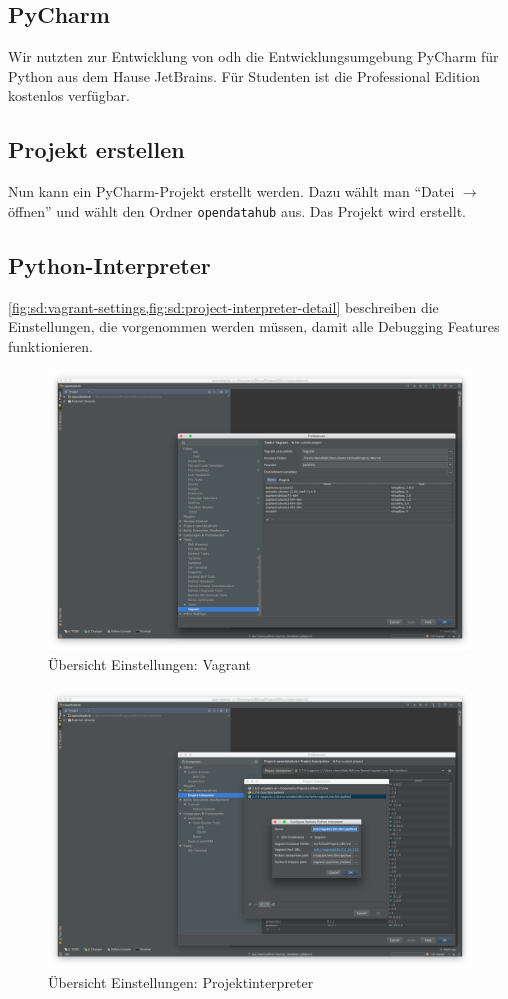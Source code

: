 \subsection{PyCharm}
Wir nutzten zur Entwicklung von \acf{odh} die Entwicklungsumgebung PyCharm für Python aus dem Hause JetBrains. Für Studenten ist die Professional Edition kostenlos verfügbar.

\subsection{Projekt erstellen}
Nun kann ein PyCharm-Projekt erstellt werden. Dazu wählt man ``Datei $\to$ öffnen'' und wählt den Ordner \texttt{opendatahub} aus. Das Projekt wird erstellt. 

\subsection{Python-Interpreter}
\cref{fig:sd:vagrant-settings,fig:sd:project-interpreter-detail} beschreiben die Einstellungen, die vorgenommen werden müssen, damit alle Debugging Features funktionieren.
\begin{figure}[H]
	\centering
	\includegraphics[width=0.8\linewidth]{fig/vagrant_settings}
	\caption{Übersicht Einstellungen: Vagrant}
	\label{fig:sd:vagrant-settings}
\end{figure}
\begin{figure}[H]
	\centering
	\includegraphics[width=0.8\linewidth]{fig/project_interpreter_detail}
	\caption{Übersicht Einstellungen: Projektinterpreter}
	\label{fig:sd:project-interpreter-detail}
\end{figure}


